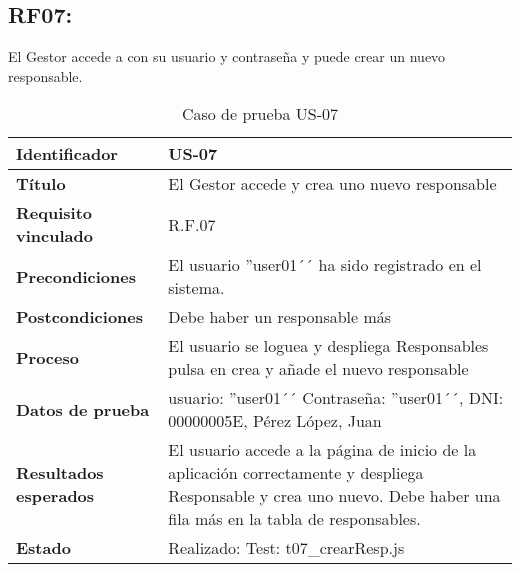 \subsection{RF07:} El Gestor accede a con su usuario y contraseña y puede crear un nuevo responsable.
\begin{table}[H]
	\centering
	\renewcommand{\arraystretch}{1.3} 
	\begin{tabularx}{\textwidth}{|l|X|}
		\hline
		\textbf{Identificador} & US-07 \\
		\hline
		\textbf{Título} & El Gestor accede y crea uno nuevo responsable \\
		\hline
		\textbf{Requisito vinculado} & R.F.07\\
		\hline
		\textbf{Precondiciones} & El usuario ''user01´´ ha sido registrado en el sistema.\\
		\hline
		\textbf{Postcondiciones} & Debe haber un responsable más \\
		\hline
		\textbf{Proceso} & El usuario se loguea y despliega Responsables pulsa en crea y añade el nuevo responsable\\
		\hline
		\textbf{Datos de prueba} & usuario: ''user01´´ Contraseña: ''user01´´, DNI: 00000005E, Pérez López, Juan \\
		\hline
		\textbf{Resultados esperados} & El usuario accede a la página de inicio de la aplicación correctamente y despliega Responsable y crea uno nuevo. Debe haber una fila más en la tabla de responsables. \\
		\hline
		\textbf{Estado} & Realizado: Test: t07\_crearResp.js\\
		\hline
	\end{tabularx}
	\caption{Caso de prueba US-07}
	\label{tab:caso_us07}
\end{table}
